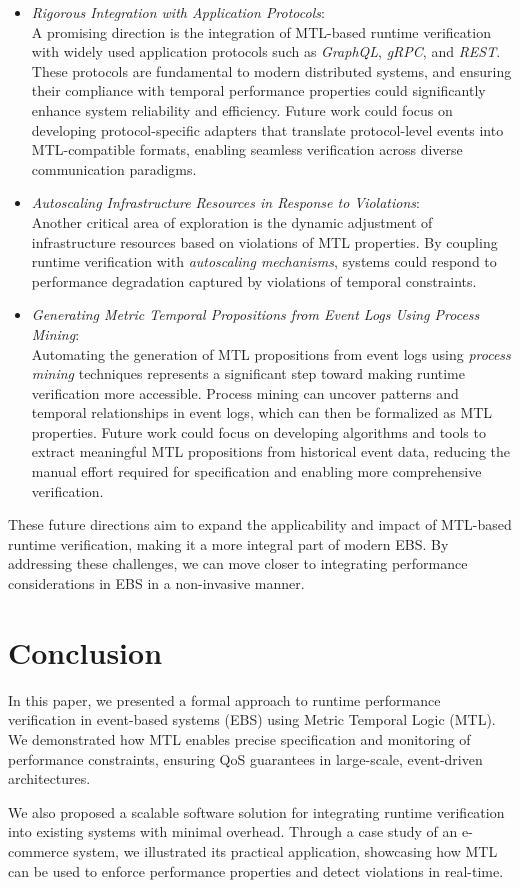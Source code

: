 \documentclass[twocolumn]{article}
\begin{document}
\begin{itemize}
	\item \emph{Rigorous Integration with Application Protocols}: \\
	      A promising direction is the integration of MTL-based runtime verification with widely used application protocols such as \emph{GraphQL}, \emph{gRPC}, and \emph{REST}. These protocols are fundamental to modern distributed systems, and ensuring their compliance with temporal performance properties could significantly enhance system reliability and efficiency. Future work could focus on developing protocol-specific adapters that translate protocol-level events into MTL-compatible formats, enabling seamless verification across diverse communication paradigms.

	\item \emph{Autoscaling Infrastructure Resources in Response to Violations}: \\
	      Another critical area of exploration is the dynamic adjustment of infrastructure resources based on violations of MTL properties. By coupling runtime verification with \emph{autoscaling mechanisms}, systems could respond to performance degradation captured by violations of temporal constraints.


	\item \emph{Generating Metric Temporal Propositions from Event Logs Using Process Mining}: \\
	      Automating the generation of MTL propositions from event logs using \emph{process mining} techniques represents a significant step toward making runtime verification more accessible. Process mining can uncover patterns and temporal relationships in event logs, which can then be formalized as MTL properties. Future work could focus on developing algorithms and tools to extract meaningful MTL propositions from historical event data, reducing the manual effort required for specification and enabling more comprehensive verification.
\end{itemize}

These future directions aim to expand the applicability and impact of MTL-based runtime verification, making it a more integral part of modern EBS. By addressing these challenges, we can move closer to integrating performance considerations in EBS in a non-invasive manner.
\section{Conclusion}
In this paper, we presented a formal approach to runtime performance verification in event-based systems (EBS) using Metric Temporal Logic (MTL). We demonstrated how MTL enables precise specification and monitoring of performance constraints, ensuring QoS guarantees in large-scale, event-driven architectures.

We also proposed a scalable software solution for integrating runtime verification into existing systems with minimal overhead. Through a case study of an e-commerce system, we illustrated its practical application, showcasing how MTL can be used to enforce performance properties and detect violations in real-time.




\end{document}
